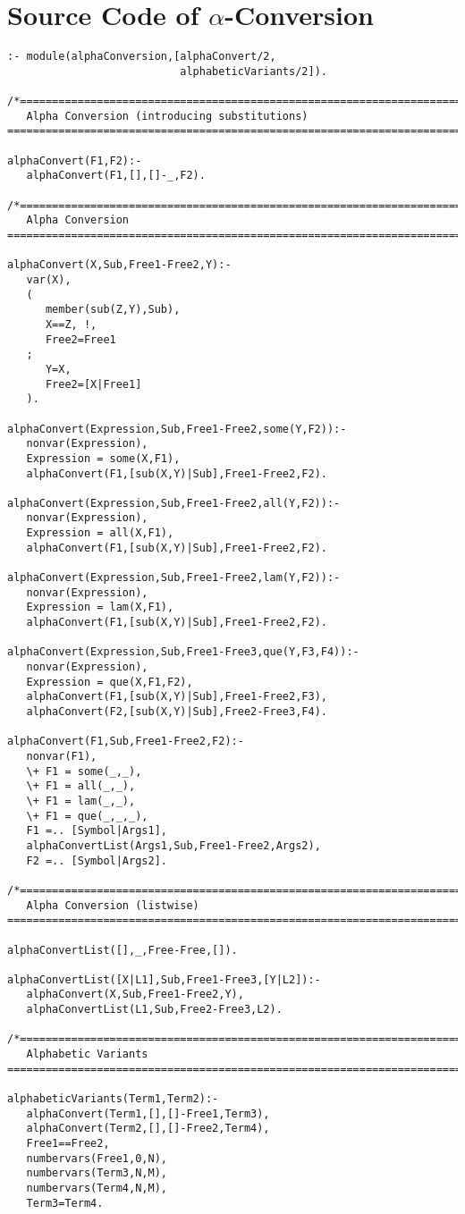 \section{Source Code of $\alpha$-Conversion} \scriptsize
\noindent\makebox[\linewidth]{\rule{\textwidth}{1pt}}
\begin{verbatim}
:- module(alphaConversion,[alphaConvert/2,
                           alphabeticVariants/2]).

/*========================================================================
   Alpha Conversion (introducing substitutions)
========================================================================*/

alphaConvert(F1,F2):-
   alphaConvert(F1,[],[]-_,F2).

/*========================================================================
   Alpha Conversion 
========================================================================*/

alphaConvert(X,Sub,Free1-Free2,Y):-
   var(X), 
   (
      member(sub(Z,Y),Sub),
      X==Z, !,
      Free2=Free1
   ;
      Y=X,
      Free2=[X|Free1]
   ).

alphaConvert(Expression,Sub,Free1-Free2,some(Y,F2)):-
   nonvar(Expression),
   Expression = some(X,F1),
   alphaConvert(F1,[sub(X,Y)|Sub],Free1-Free2,F2).

alphaConvert(Expression,Sub,Free1-Free2,all(Y,F2)):- 
   nonvar(Expression),
   Expression = all(X,F1),
   alphaConvert(F1,[sub(X,Y)|Sub],Free1-Free2,F2).

alphaConvert(Expression,Sub,Free1-Free2,lam(Y,F2)):- 
   nonvar(Expression),
   Expression = lam(X,F1),
   alphaConvert(F1,[sub(X,Y)|Sub],Free1-Free2,F2).

alphaConvert(Expression,Sub,Free1-Free3,que(Y,F3,F4)):-
   nonvar(Expression),
   Expression = que(X,F1,F2),
   alphaConvert(F1,[sub(X,Y)|Sub],Free1-Free2,F3),
   alphaConvert(F2,[sub(X,Y)|Sub],Free2-Free3,F4).

alphaConvert(F1,Sub,Free1-Free2,F2):-
   nonvar(F1),
   \+ F1 = some(_,_),
   \+ F1 = all(_,_),
   \+ F1 = lam(_,_),
   \+ F1 = que(_,_,_),
   F1 =.. [Symbol|Args1],
   alphaConvertList(Args1,Sub,Free1-Free2,Args2),
   F2 =.. [Symbol|Args2].

/*========================================================================
   Alpha Conversion (listwise)
========================================================================*/

alphaConvertList([],_,Free-Free,[]).

alphaConvertList([X|L1],Sub,Free1-Free3,[Y|L2]):-
   alphaConvert(X,Sub,Free1-Free2,Y),
   alphaConvertList(L1,Sub,Free2-Free3,L2).

/*========================================================================
   Alphabetic Variants
========================================================================*/

alphabeticVariants(Term1,Term2):-
   alphaConvert(Term1,[],[]-Free1,Term3),
   alphaConvert(Term2,[],[]-Free2,Term4),
   Free1==Free2,
   numbervars(Free1,0,N),
   numbervars(Term3,N,M),
   numbervars(Term4,N,M),
   Term3=Term4.
\end{verbatim}
\noindent\makebox[\linewidth]{\rule{\textwidth}{1pt}}
